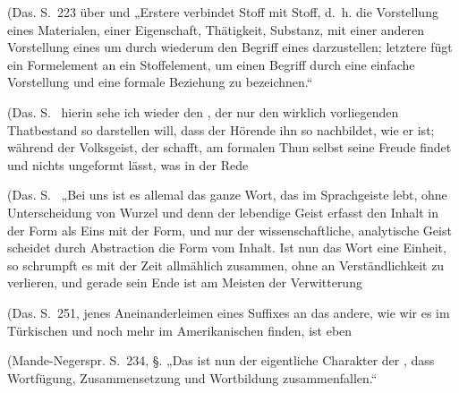 \label{fp.324}

(Das. S.~223 über  und  „Erstere verbindet Stoff mit Stoff, d.~h. die Vorstellung eines Materialen, einer Eigenschaft, Thätigkeit, Substanz, mit einer anderen Vorstellung eines  um durch  wiederum den Begriff eines  darzustellen; letztere fügt ein Formelement an ein Stoffelement, um einen Begriff durch eine einfache Vorstellung und eine formale Beziehung zu bezeichnen.“

(Das. S.~  hierin sehe ich wieder den \label{fp.193}, der nur den wirklich vorliegenden Thatbestand so darstellen will, dass der Hörende ihn so nachbildet, wie er ist; während der Volksgeist, der  schafft, am formalen Thun selbst seine Freude findet und nichts ungeformt lässt, was in der Rede 

(Das. S.~ „Bei uns ist es allemal das ganze Wort, das im Sprachgeiste lebt, ohne Unterscheidung von Wurzel und  denn der lebendige Geist erfasst den Inhalt in der Form als Eins mit der Form, und nur der wissenschaftliche, analytische Geist scheidet durch Abstraction die Form vom Inhalt. Ist nun das Wort eine Einheit, so schrumpft es mit der Zeit allmählich zusammen, ohne an Verständlichkeit zu verlieren, und gerade sein Ende ist am Meisten der Verwitterung 

(Das. S.~251,    jenes Aneinanderleimen eines Suffixes an das andere, wie wir es im Türkischen und noch mehr im Amerikanischen finden, ist eben  

(Mande-Negerspr. S.~234, §.  „Das ist nun der eigentliche Charakter der , dass Wortfügung, Zusammensetzung und Wortbildung zusammenfallen.“

